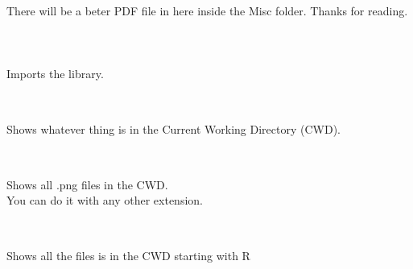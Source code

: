 \documentclass[a4paper,18pt]{article}
\begin{document}
There will be a beter PDF file in here inside the Misc folder. Thanks for reading.\\\\










\section{\colorbox {Abi}{}}
\subsection{\colorbox {matgreen}{\color{white}{\large import glob}}}
Imports the library.\\\\


\subsection{\colorbox {matgreen}{\color{white}{\large glob.glob('*')}}}
Shows whatever thing is in the Current Working Directory (CWD).\\\\


\subsection{\colorbox {matgreen}{\color{white}{\large glob.glob('*.png')}}}
Shows all .png files in the CWD.\\ 
You can do it with any other extension.\\\\


\subsection{\colorbox {matgreen}{\color{white}{\large glob.glob('R*')}}}
Shows all the files is in the CWD starting with R\\\\
\end{document}
